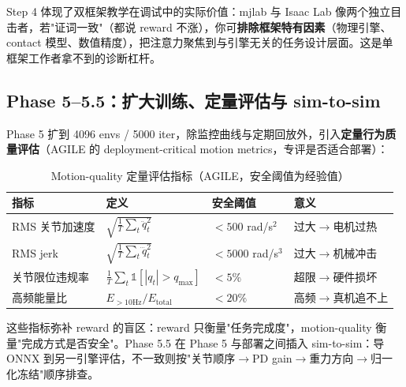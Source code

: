 \begin{insight}\label{ins:rlmc-diag-twowitness}
Step 4 体现了双框架教学在调试中的实际价值：mjlab 与 Isaac Lab 像两个独立目击者，若"证词一致"（都说 reward 不涨），你可\textbf{排除框架特有因素}（物理引擎、contact 模型、数值精度），把注意力聚焦到与引擎无关的任务设计层面。这是单框架工作者拿不到的诊断杠杆。
\end{insight}

\subsection{Phase 5--5.5：扩大训练、定量评估与 sim-to-sim}

Phase 5 扩到 4096 envs / 5000 iter，除监控曲线与定期回放外，引入\textbf{定量行为质量评估}（AGILE 的 deployment-critical motion metrics，专评是否适合部署）\cite{nvidia2026agile}：

\begin{table}[H]
\centering
\caption{Motion-quality 定量评估指标（AGILE，安全阈值为经验值）}
\label{tab:rlmc-diag-motionq}
\begin{tabular}{p{3.2cm}p{3.6cm}p{2.8cm}p{3.0cm}}
\hline
指标 & 定义 & 安全阈值 & 意义 \\
\hline
RMS 关节加速度 & $\sqrt{\frac1T\sum_t \ddot q_t^2}$ & $<500$ rad/s$^2$ & 过大$\to$电机过热 \\
RMS jerk & $\sqrt{\frac1T\sum_t \dddot q_t^2}$ & $<5000$ rad/s$^3$ & 过大$\to$机械冲击 \\
关节限位违规率 & $\frac1T\sum_t \mathbb{1}[|q_t|>q_{\max}]$ & $<5\%$ & 超限$\to$硬件损坏 \\
高频能量比 & $E_{>10\text{Hz}}/E_{\text{total}}$ & $<20\%$ & 高频$\to$真机追不上 \\
\hline
\end{tabular}
\end{table}

这些指标弥补 reward 的盲区：reward 只衡量"任务完成度"，motion-quality 衡量"完成方式是否安全"。Phase 5.5 在 Phase 5 与部署之间插入 sim-to-sim：导 ONNX 到另一引擎评估，不一致则按"关节顺序$\to$PD gain$\to$重力方向$\to$归一化冻结"顺序排查。

